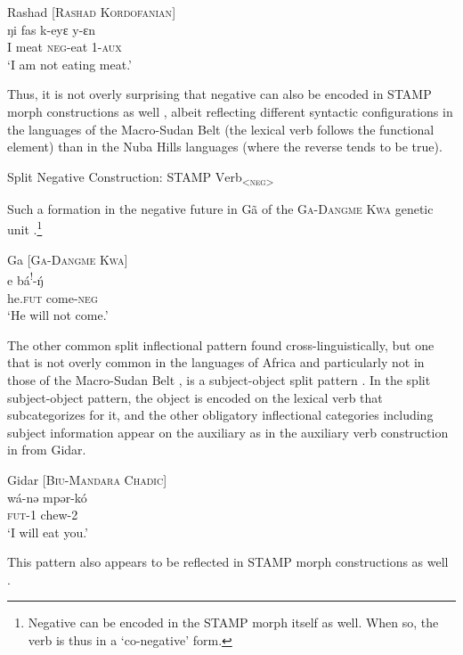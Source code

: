 \documentclass[output=paper]{langsci/langscibook}
\begin{document}
\ea\label{ex:anderson:26}
Rashad \citep[297]{TuckerBryan1966}      [\textsc{Rashad Kordofanian}]\\
\gll ŋi   fas    k-eyɛ    y-ɛn\\
I  meat    \textsc{neg}-eat  1-\textsc{aux}\\
\glt `I am not eating meat.'
\z

Thus, it is not overly surprising that negative can also be encoded in STAMP morph constructions as well , albeit reflecting different syntactic configurations in the languages of the Macro-Sudan Belt (the lexical verb follows the functional element) than in the Nuba Hills languages (where the reverse tends to be true).

\ea\label{ex:anderson:27}
Split Negative Construction:  \textsc{STAMP  V}erb\textsc{\textsubscript{<neg>}}
\z

Such a formation in the negative future in Gã of the \textsc{Ga-Dangme Kwa} genetic unit .\footnote{Negative can be encoded in the STAMP morph itself as well. When so, the verb is thus in a `co-negative' form.}

\ea\label{ex:anderson:28}
Ga \citep[105]{Kropp1988}        [\textsc{Ga-Dangme Kwa}]\\
\gll e\textsuperscript{{\textbar}}    bá\textsuperscript{!}-\'{ŋ}\\
he\textsc{.fut}  come-\textsc{neg}\\
\glt `He will not come.'
\z

The other common split inflectional pattern found cross-linguistically, but one that is not overly common in the languages of Africa and particularly not in those of the Macro-Sudan Belt \citep{Anderson2011}, is a subject-object split pattern \citep{Anderson2006}. In the split subject-object pattern, the object is encoded on the lexical verb that subcategorizes for it, and the other obligatory inflectional categories including subject information appear on the auxiliary as in the auxiliary verb construction in  from Gidar.

\ea\label{ex:anderson:29}
Gidar \citep[263]{Frajzyngier2008}        \textsc{[Biu-Mandara Chadic]}\\
\gll wá-nə    mpər-kó\\
\textsc{fut}-1    chew-2\\
\glt `I will eat you.'
\z

This pattern also appears to be reflected in STAMP morph constructions as well . 
\end{document}
